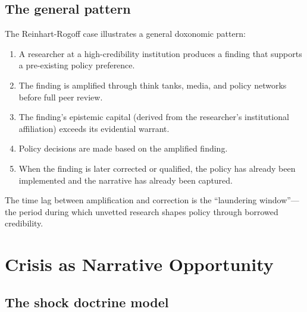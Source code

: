 \subsection{The general pattern}

The Reinhart-Rogoff case illustrates a general doxonomic pattern:

\begin{model}
\label{mod:credibility-laundering}
\begin{enumerate}[nosep]
  \item A researcher at a high-credibility institution produces a finding that supports a pre-existing policy preference.
  \item The finding is amplified through think tanks, media, and policy networks before full peer review.
  \item The finding's epistemic capital (derived from the researcher's institutional affiliation) exceeds its evidential warrant.
  \item Policy decisions are made based on the amplified finding.
  \item When the finding is later corrected or qualified, the policy has already been implemented and the narrative has already been captured.
\end{enumerate}
The time lag between amplification and correction is the ``laundering window''---the period during which unvetted research shapes policy through borrowed credibility.
\end{model}

\section{Crisis as Narrative Opportunity}
\label{sec:ch25-crisis}

\subsection{The shock doctrine model}


